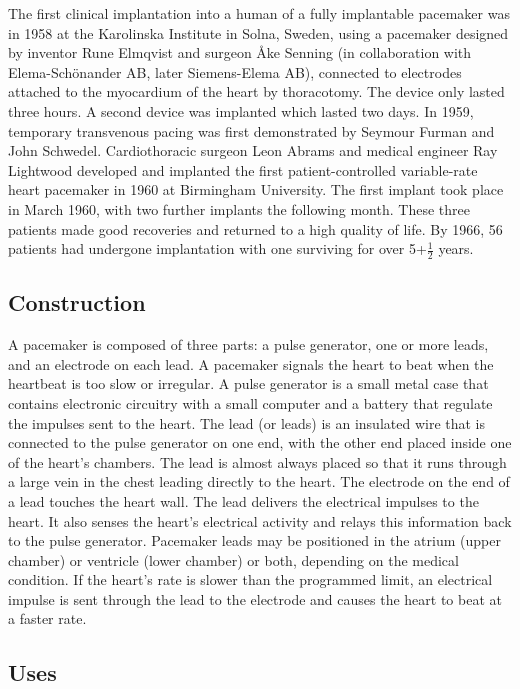 \documentclass[11pt]{article}
\begin{document}
The first clinical implantation into a human of a fully implantable pacemaker was in 1958 at the Karolinska Institute in Solna, Sweden, using a pacemaker designed by inventor Rune Elmqvist and surgeon Åke Senning (in collaboration with Elema-Schönander AB, later Siemens-Elema AB), connected to electrodes attached to the myocardium of the heart by thoracotomy. The device only lasted three hours. A second device was implanted which lasted two days. In 1959, temporary transvenous pacing was first demonstrated by Seymour Furman and John Schwedel. Cardiothoracic surgeon Leon Abrams and medical engineer Ray Lightwood developed and implanted the first patient-controlled variable-rate heart pacemaker in 1960 at Birmingham University. The first implant took place in March 1960, with two further implants the following month. These three patients made good recoveries and returned to a high quality of life. By 1966, 56 patients had undergone implantation with one surviving for over 5+$\frac{1}{2}$ years.

\subsection*{Construction}

A pacemaker is composed of three parts: a pulse generator, one or more leads, and an electrode on each lead. A pacemaker signals the heart to beat when the heartbeat is too slow or irregular. A pulse generator is a small metal case that contains electronic circuitry with a small computer and a battery that regulate the impulses sent to the heart. The lead (or leads) is an insulated wire that is connected to the pulse generator on one end, with the other end placed inside one of the heart's chambers. The lead is almost always placed so that it runs through a large vein in the chest leading directly to the heart. The electrode on the end of a lead touches the heart wall. The lead delivers the electrical impulses to the heart. It also senses the heart's electrical activity and relays this information back to the pulse generator. Pacemaker leads may be positioned in the atrium (upper chamber) or ventricle (lower chamber) or both, depending on the medical condition. If the heart's rate is slower than the programmed limit, an electrical impulse is sent through the lead to the electrode and causes the heart to beat at a faster rate.

\subsection*{Uses}
\end{document}
